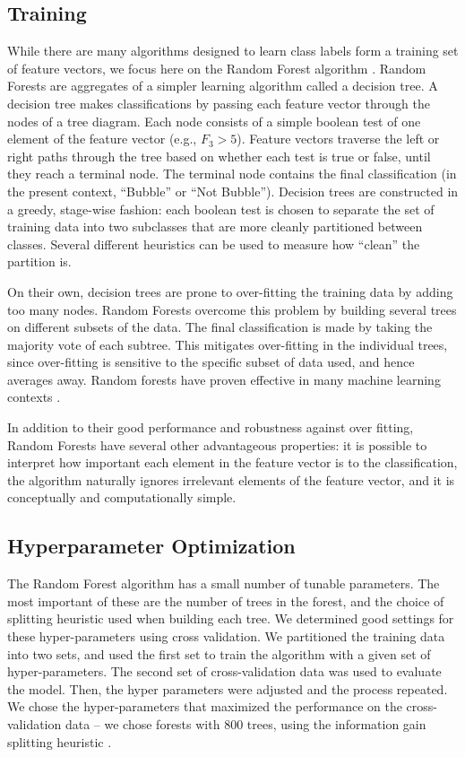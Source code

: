 \documentclass[preprint]{aastex}
\begin{document}
\subsection{Training}
While there are many algorithms designed to learn class labels form a training set of feature vectors, we focus here on the Random Forest algorithm \citep{Breiman01}. Random Forests are aggregates of a simpler learning algorithm called a decision tree. A decision tree makes classifications by passing each feature vector through the nodes of a tree diagram. Each node consists of a simple boolean test of one element of the feature vector (e.g., $F_3 > 5$). Feature vectors traverse the left or right paths through the tree based on whether each test is true or false, until they reach a terminal node. The terminal node contains the final classification (in the present context, ``Bubble'' or ``Not Bubble''). Decision trees are constructed in a greedy, stage-wise fashion: each boolean test is chosen to separate the set of training data into two subclasses that are more cleanly partitioned between classes. Several different heuristics can be used to measure how ``clean'' the partition is.

On their own, decision trees are prone to over-fitting the training data by adding too many nodes. Random Forests overcome this problem by building several trees on different subsets of the data. The final classification is made by taking the majority vote of each subtree. This mitigates over-fitting in the individual trees, since over-fitting is sensitive to the specific subset of data used, and hence averages away. Random forests have proven effective in many machine learning contexts \citep{Kuhn13}.

In addition to their good performance and robustness against over fitting, Random Forests have several other advantageous properties: it is possible to interpret how important each element in the feature vector is to the classification, the algorithm naturally ignores irrelevant elements of the feature vector, and it is conceptually and computationally simple.

\subsection{Hyperparameter Optimization}
The Random Forest algorithm has a small number of tunable parameters. The most important of these are the number of trees in the forest, and the choice of splitting heuristic used when building each tree. We determined good settings for these hyper-parameters using cross validation. We partitioned the training data into two sets, and used the first set to train the algorithm with a given set of hyper-parameters. The second set of cross-validation data was used to evaluate the model. Then, the hyper parameters were adjusted and the process repeated. We chose the hyper-parameters that maximized the performance on the cross-validation data -- we chose forests with 800 trees, using the information gain splitting heuristic \citep{Raileanu04}.
\end{document}
